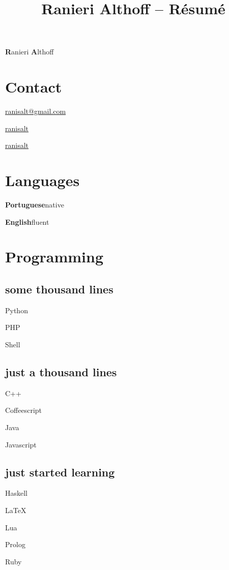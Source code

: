 \documentclass{article}
\def\emcolor{blue!25!black}
\newcommand{\fgem}{\color{\emcolor}}%
\newcommand{\contactentry}[2]{%
	\parbox{\textwidth}{\hfill #2 \hspace{1em}\null}
}
\newcommand{\languageentry}[2]{%
	\parbox{\textwidth}{\hfill \textbf{#1}\hspace{1em}#2\hspace{1em}\null}
}
\newenvironment{aside}{%
\noindent
\begin{minipage}[t]{\dimexpr0.25\textwidth}%
\let\oldsection\section
\let\oldsubsection\subsection
\renewcommand{\section}[1]{\oldsection*{\fgem ##1}}
\renewcommand{\subsection}[1]{\oldsubsection*{\small ##1}\vspace{-0.5em}}
\begin{center}%
}{%
\end{center}%
\let\subsection\oldsubsection
\let\section\oldsection
\end{minipage}%
}
\begin{document}
 \selectfont

\title{Ranieri Althoff -- Résumé}

\hfill \Huge \textbf{R}anieri \textbf{A}lthoff
\normalsize \par
\vspace{\fill}

\begin{aside}
\section{Contact}
\contactentry{email}{\href{mailto:ranisalt+cv@gmail.com}{ranisalt@gmail.com}}
\contactentry{github}{\href{https://github.com/ranisalt}{ranisalt}}
\contactentry{twitter}{\href{https://twitter.com/ranisalt}{ranisalt}}


\section{Languages}
\languageentry{Portuguese}{native}
\languageentry{English}{fluent}


\section{Programming}
\subsection{some thousand lines}
\begin{itemize*}
\item{Python}
\item{PHP}
\item{Shell}
\end{itemize*}

\subsection{just a thousand lines}
\begin{itemize*}
\item{C++}
\item{Coffeescript}
\item{Java}
\item{Javascript}
\end{itemize*}

\subsection{just started learning}
\begin{itemize*}
\item{Haskell}
\item{\LaTeX}
\item{Lua}
\item{Prolog}
\item{Ruby}
\end{itemize*}



\end{aside}
\end{document}
